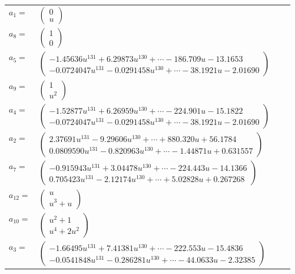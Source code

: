 \documentclass[1p]{elsarticle_modified}
\theoremstyle{definition}
\begin{document}
\begin{tabular}{m{7pt} m{180pt} m{7pt} m{180pt} }
\flushright $a_{1}=$&$\begin{pmatrix}0\\u\end{pmatrix}$ \\
\flushright $a_{8}=$&$\begin{pmatrix}1\\0\end{pmatrix}$ \\
\flushright $a_{5}=$&$\begin{pmatrix}-1.45636 u^{131}+6.29873 u^{130}+\cdots-186.709 u-13.1653\\-0.0724047 u^{131}-0.0291458 u^{130}+\cdots-38.1921 u-2.01690\end{pmatrix}$ \\
\flushright $a_{9}=$&$\begin{pmatrix}1\\u^2\end{pmatrix}$ \\
\flushright $a_{4}=$&$\begin{pmatrix}-1.52877 u^{131}+6.26959 u^{130}+\cdots-224.901 u-15.1822\\-0.0724047 u^{131}-0.0291458 u^{130}+\cdots-38.1921 u-2.01690\end{pmatrix}$ \\
\flushright $a_{2}=$&$\begin{pmatrix}2.37691 u^{131}-9.29606 u^{130}+\cdots+880.320 u+56.1784\\0.0809590 u^{131}-0.820963 u^{130}+\cdots-1.44871 u+0.631557\end{pmatrix}$ \\
\flushright $a_{7}=$&$\begin{pmatrix}-0.915943 u^{131}+3.04478 u^{130}+\cdots-224.443 u-14.1366\\0.705423 u^{131}-2.12174 u^{130}+\cdots+5.02828 u+0.267268\end{pmatrix}$ \\
\flushright $a_{12}=$&$\begin{pmatrix}u\\u^3+u\end{pmatrix}$ \\
\flushright $a_{10}=$&$\begin{pmatrix}u^2+1\\u^4+2 u^2\end{pmatrix}$ \\
\flushright $a_{3}=$&$\begin{pmatrix}-1.66495 u^{131}+7.41381 u^{130}+\cdots-222.553 u-15.4836\\-0.0541848 u^{131}-0.286281 u^{130}+\cdots-44.0633 u-2.32385\end{pmatrix}$ \\

\end{tabular}
\end{document}
